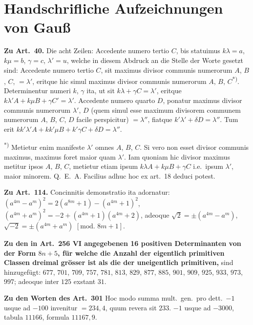 \documentclass[12pt,a4paper]{article}
\theoremstyle{plain}
\theoremstyle{definition}
\theoremstyle{remark}
\begin{document}
\newpage
\section*{Handschrifliche Aufzeichnungen von Gau\ss}

\textbf{Zu Art.\ 40.} Die acht Zeilen: Accedente numero tertio $C$, bis statuimus $k\lambda = a$, $k\mu = b$, $\gamma = c$, $\lambda' = u$, welche in diesem Abdruck an die Stelle der Worte gesetzt sind: Accedente numero tertio $C$, sit maximus divisor communis numerorum $A$, $B$, $C$, $= \lambda'$, eritque hic simul maximus divisor communis numerorum $A$, $B$, $C$\textsuperscript{*)}. Determinentur numeri $k$, $\gamma$ ita, ut sit $k\lambda + \gamma C = \lambda'$, eritque $k\lambda'A + k\mu B + \gamma C' = \lambda'$. Accedente numero quarto $D$, ponatur maximus divisor communis numerorum $\lambda'$, $D$ (quem simul esse maximum divisorem communem numerorum $A$, $B$, $C$, $D$ facile perspicitur) $= \lambda''$, fiatque $k'\lambda' + \delta D = \lambda''$. Tum erit $kk'\lambda'A + kk'\mu B + k'\gamma C + \delta D = \lambda''$.

\vspace{0.3em}
\noindent\textsuperscript{*)} Metietur enim manifeste $\lambda'$ omnes $A$, $B$, $C$. Si vero non esset divisor communis maximus, maximus foret maior quam $\lambda'$. Iam quoniam hic divisor maximus metitur ipsos $A$, $B$, $C$, metietur etiam ipsum $k\lambda A + k\mu B + \gamma C$ i.e.\ ipsum $\lambda'$, maior minorem. Q.\ E.\ A. Facilius adhuc hoc ex art.\ 18 deduci potest.

\vspace{0.5em}
\textbf{Zu Art.\ 114.} Concinnitis demonstratio ita adornatur: $(a^{4m} - a^m)^2 = 2(a^{8m} + 1) - (a^{4m} + 1)^2$,
$(a^{4m} + a^m)^2 = -2 + (a^{4m} + 1)(a^{4m} + 2)$, adeoque $\sqrt{2} = \pm(a^{4m} - a^m)$, $\sqrt{-2} = \pm(a^{4m} + a^m)$ $[\text{mod.\ } 8m+1]$.

\vspace{0.5em}
\textbf{Zu den in Art.\ 256 VI angegebenen 16 positiven Determinanten von der Form $8n+5$, f\"ur welche die Anzahl der eigentlich primitiven Classen dreimal gr\"osser ist als die der uneigentlich primitiven,} sind hinzugef\"ugt: $677$, $701$, $709$, $757$, $781$, $813$, $829$, $877$, $885$, $901$, $909$, $925$, $933$, $973$, $997$; adeoque inter $125$ exstant $31$.

\vspace{0.5em}
\textbf{Zu den Worten des Art.\ 301} Hoc modo summa mult.\ gen.\ pro dett.\ $-1$ usque ad $-100$ invenitur $= 234{,}4$, quum revera sit $233$. $-1$ usque ad $-3000$, tabula $11166$, formula $11167{,}9$.
\end{document}
